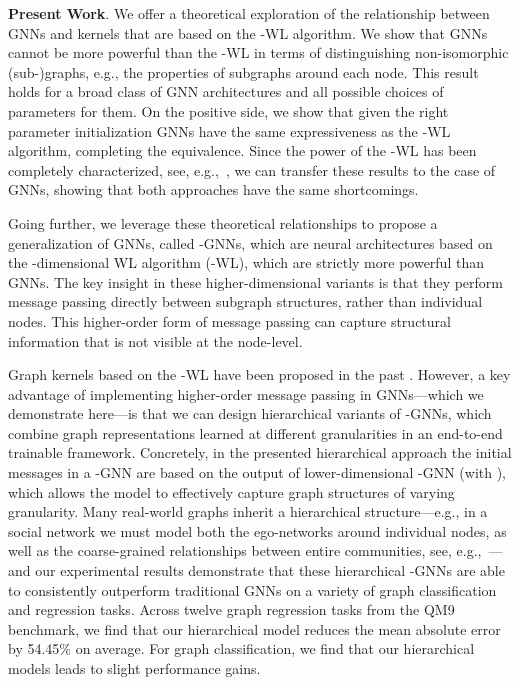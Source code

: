 \documentclass[letterpaper]{article}
\theoremstyle{definition}
\newcommand{\xhdr}[1]{{\noindent\bfseries #1}.}
\begin{document}
\xhdr{Present Work}
We offer a theoretical exploration of the relationship between GNNs and kernels that are based on the -WL algorithm. 
We show that GNNs cannot be more powerful than the -WL in terms of distinguishing non-isomorphic (sub-)graphs, e.g., the properties of subgraphs around each node. 
This result holds for a broad class of GNN architectures and all possible choices of parameters for them.
On the positive side, we show that given the right parameter initialization GNNs have the same expressiveness as the -WL algorithm, completing the equivalence. 
Since the power of the -WL has been completely characterized, see, e.g.,~\cite{Arv+2015,kiefer2015graphs}, we can transfer these results to the case of GNNs, showing that both approaches have the same shortcomings.

Going further, we leverage these theoretical relationships to propose a generalization of GNNs, called -GNNs, which are neural architectures based on the -dimensional WL algorithm (-WL), which are strictly more powerful than GNNs. 
The key insight in these higher-dimensional variants is that they perform message passing directly between subgraph structures, rather than individual nodes.
This higher-order form of message passing can capture structural information that is not visible at the node-level.

Graph kernels based on the -WL have been proposed in the past \cite{Mor+2017}.
However, a key advantage of implementing higher-order message passing in GNNs---which we demonstrate here---is that we can design hierarchical variants of -GNNs, which combine graph representations learned at different granularities in an end-to-end trainable framework. 
Concretely, in the presented hierarchical approach the initial messages in a -GNN are based on the output of lower-dimensional -GNN (with ), which allows the model to effectively capture graph structures of varying granularity.  Many real-world graphs inherit a hierarchical structure---e.g., in a social network we must model both the ego-networks around individual nodes, as well as the coarse-grained relationships between entire communities, see, e.g.,~\cite{New2003}---and our experimental results demonstrate that these hierarchical -GNNs are able to consistently outperform traditional GNNs on a variety of graph classification and regression tasks. Across twelve graph regression tasks from the QM9 benchmark, we find that our hierarchical model reduces the mean absolute error by 54.45\% on average. For graph classification, we find that our hierarchical models leads to slight performance gains.
\end{document}
